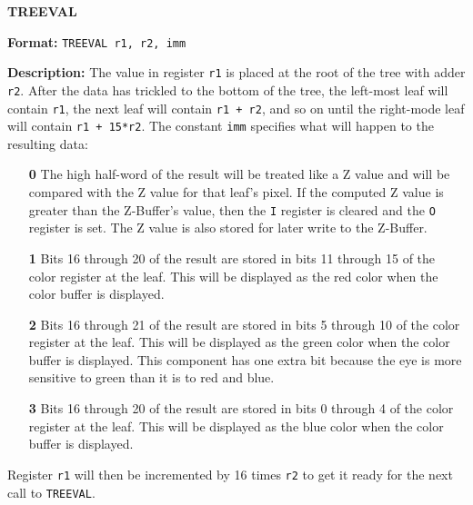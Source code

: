 \noindent\textsf{\textbf{\Large TREEVAL}}\par
{}\par\begin{indented}{\bf Format:}
{\tt TREEVAL r1, r2, imm}\par\vspace{3ex}
\end{indented}\vspace{4ex}
\begin{indented}{\bf Description:}
The value in register {\tt r1} is placed at the root of the tree with
adder {\tt r2}.  After the data has trickled to the bottom of the tree,
the left-most leaf will contain {\tt r1}, the next leaf will contain
{\tt r1 + r2}, and so on until the right-mode leaf will contain
{\tt r1 + 15*r2}.  The constant {\tt imm} specifies what will happen
to the resulting data:
\begin{itemize}
\item[\bf 0]The high half-word of the result will be treated like a Z value and
will be compared with the Z value for that leaf's pixel.  If the computed
Z value is greater than the Z-Buffer's value, then the {\tt I} register
is cleared and the {\tt O} register is set.  The Z value is also
stored for later write to the Z-Buffer.
\item[\bf 1]Bits 16 through 20 of the result are stored in bits 11 through 15
of the color register at the leaf.  This will be displayed as the red
color when the color buffer is displayed.
\item[\bf 2]Bits 16 through 21 of the result are stored in bits 5 through 10
of the color register at the leaf.  This will be displayed as the green
color when the color buffer is displayed.  This component has one extra
bit because the eye is more sensitive to green than it is to red and blue.
\item[\bf 3]Bits 16 through 20 of the result are stored in bits 0 through 4
of the color register at the leaf.  This will be displayed as the blue
color when the color buffer is displayed.
\end{itemize}
Register {\tt r1} will then be incremented by 16 times
{\tt r2} to get it ready for the next call to {\tt TREEVAL}.
\end{indented}
\vspace{2em}

